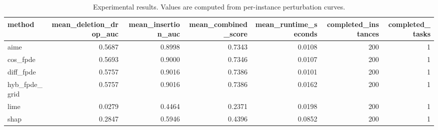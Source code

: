 \begin{table}[t]
\caption{Experimental results. Values are computed from per-instance perturbation curves.}
\label{tab:main_results_computed}
\centering
\begin{tabular}{lrrrrrr}
\toprule
method & mean\_deletion\_drop\_auc & mean\_insertion\_auc & mean\_combined\_score & mean\_runtime\_seconds & completed\_instances & completed\_tasks \\
\midrule
aime & 0.5687 & 0.8998 & 0.7343 & 0.0108 & 200 & 1 \\
cos\_fpde & 0.5693 & 0.9000 & 0.7346 & 0.0107 & 200 & 1 \\
diff\_fpde & 0.5757 & 0.9016 & 0.7386 & 0.0101 & 200 & 1 \\
hyb\_fpde\_grid & 0.5757 & 0.9016 & 0.7386 & 0.0162 & 200 & 1 \\
lime & 0.0279 & 0.4464 & 0.2371 & 0.0198 & 200 & 1 \\
shap & 0.2847 & 0.5946 & 0.4396 & 0.0852 & 200 & 1 \\
\bottomrule
\end{tabular}

\end{table}
